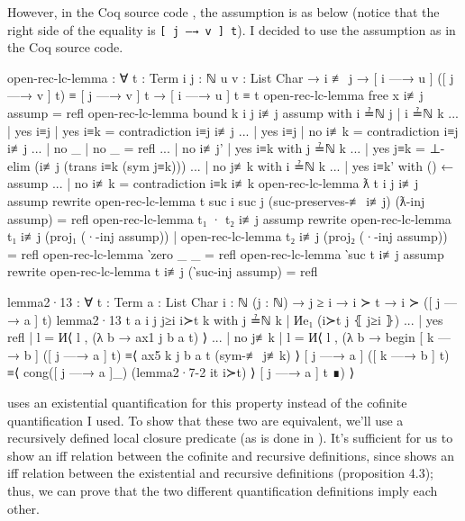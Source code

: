 However, in the Coq source code \citep{chargueraud_lambda_jar_paperv_2023}, the assumption is as below (notice that the right side of the
equality is \texttt{[ j —→ v ] t}). I decided to use the assumption as in the Coq source code.
\begin{code}
  open-rec-lc-lemma : ∀ {t : Term} {i j : ℕ} {u v : List Char}
    → i ≢ j
    → [ i —→ u ] ([ j —→ v ] t) ≡ [ j —→ v ] t
    → [ i —→ u ] t ≡ t
  open-rec-lc-lemma {free x} i≢j assump = refl
  open-rec-lc-lemma {bound k} {i} {j} i≢j assump
    with i ≟ℕ j | i ≟ℕ k
  ... | yes i≡j | yes i≡k = contradiction i≡j i≢j
  ... | yes i≡j | no  i≢k = contradiction i≡j i≢j
  ... | no  _   | no  _   = refl
  ... | no i≢j' | yes i≡k with j ≟ℕ k
  ...   | yes j≡k = ⊥-elim (i≢j (trans i≡k (sym j≡k)))
  ...   | no  j≢k with i ≟ℕ k
  ...     | yes i≡k' with () ← assump
  ...     | no  i≢k  = contradiction i≡k i≢k
  open-rec-lc-lemma {ƛ t} {i} {j} i≢j assump
    rewrite open-rec-lc-lemma {t} {suc i} {suc j}
        (suc-preserves-≢ i≢j)
        (ƛ-inj assump)
      = refl
  open-rec-lc-lemma {t₁ · t₂} i≢j assump
    rewrite
      open-rec-lc-lemma {t₁} i≢j (proj₁ (·-inj assump))
    | open-rec-lc-lemma {t₂} i≢j (proj₂ (·-inj assump))
    = refl
  open-rec-lc-lemma {‵zero} _ _ = refl
  open-rec-lc-lemma {‵suc t} i≢j assump
    rewrite open-rec-lc-lemma {t} i≢j (‵suc-inj assump) = refl

  lemma2·13 : ∀ {t : Term} {a : List Char} {i : ℕ} (j : ℕ)
    → j ≥ i
    → i ≻ t
    → i ≻ ([ j —→ a ] t)
  lemma2·13 {t} {a} {i} j j≥i i≻t k
    with j ≟ℕ k | Иe₁ (i≻t j ⦃ j≥i ⦄)
  ... | yes refl | l = И⟨ l , (λ b → ax1 j b a t) ⟩
  ... | no  j≢k  | l = И⟨ l , (λ b →
    begin
      [ k —→ b ] ([ j —→ a ] t)
    ≡⟨ ax5 k j b a t (sym-≢ j≢k) ⟩
      [ j —→ a ] ([ k —→ b ] t)
    ≡⟨ cong([ j —→ a ]_) (lemma2·7-2 it i≻t) ⟩
      [ j —→ a ] t
    ∎) ⟩
\end{code}

\citet{pitts_locally_2023} uses an existential quantification for this property instead of the
cofinite quantification I used. To show that these two are equivalent, we'll use a recursively
defined local closure predicate (as is done in \citet{chargueraud_locally_2012}). It's sufficient
for us to show an iff relation between the cofinite and recursive definitions, since
\citet{pitts_locally_2023} shows an iff relation between the existential and recursive definitions
(proposition 4.3); thus, we can prove that the two different quantification definitions imply each
other.

